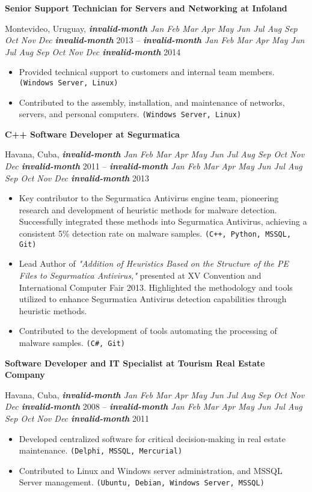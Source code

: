 \documentclass[a4paper]{article}
\newcommand{\invalidmonth}{\emph{\textbf{invalid-month}}}
\newcommand{\cvmonth}[1]{
  \ifcase#1 \invalidmonth
    \or Jan
    \or Feb
    \or Mar
    \or Apr
    \or May
    \or Jun
    \or Jul
    \or Aug
    \or Sep
    \or Oct
    \or Nov
    \or Dec
  \else
    \invalidmonth
  \fi
}
\newcommand{\cvdate}[2]{
  \emph{\cvmonth{#1}} {#2}
}
\newcommand{\cvposition}[2]{
  \noindent\textbf{#1 at #2}\par
}
\newcommand{\cvlocation}[3]{
  \noindent #1, #2 -- #3\par
}
\newenvironment{cvexperience}{
  \noindent{\large\textbf{Work Experience:}}
  \medskip
}{
  \bigskip
}
\newenvironment{cvjob}{
  \begin{sloppypar}
}{
  \end{sloppypar}
  \bigskip
}
\newcommand{\cvskills}[1]{\texttt{(#1)}}
\begin{document}
\begin{cvexperience}
\begin{cvjob}
  \cvposition{Senior Support Technician for Servers and Networking}{Infoland}
  \cvlocation{Montevideo, Uruguay}{\cvdate{11}{2013}}{\cvdate{7}{2014}}
  
  \begin{itemize}
    \item Provided technical support to customers and internal team members. \cvskills{Windows Server, Linux}
    \item Contributed to the assembly, installation, and maintenance of networks, servers, and personal computers. \cvskills{Windows Server, Linux}
  \end{itemize}
\end{cvjob}

\newpage
\begin{cvjob}
  \cvposition{C++ Software Developer}{Segurmatica}  
  \cvlocation{Havana, Cuba}{\cvdate{3}{2011}}{\cvdate{6}{2013}}

  \begin{itemize}
    \item Key contributor to the Segurmatica Antivirus engine team, pioneering research and
    development of heuristic methods for malware detection. Successfully integrated these methods
    into Segurmatica Antivirus, achieving a consistent 5\% detection rate on malware samples. \cvskills{C++, Python, MSSQL, Git}
    
    \item Lead Author of \emph{"Addition of Heuristics Based on the Structure
    of the PE Files to Segurmatica Antivirus,"} presented at XV Convention and International Computer Fair
    2013. Highlighted the methodology and tools utilized to enhance Segurmatica Antivirus detection capabilities through heuristic methods.
    
    \item Contributed to the development of tools automating the processing of malware samples. \cvskills{C\#, Git}
  \end{itemize}
\end{cvjob}

\begin{cvjob}
  \cvposition{Software Developer and IT Specialist}{Tourism Real Estate Company}
  \cvlocation{Havana, Cuba}{\cvdate{10}{2008}}{\cvdate{2}{2011}}

  \begin{itemize}
    \item Developed centralized software for critical decision-making in real estate maintenance. \cvskills{Delphi, MSSQL, Mercurial}
    \item Contributed to Linux and Windows server administration, and MSSQL Server management. \cvskills{Ubuntu, Debian, Windows Server, MSSQL}
  \end{itemize}
\end{cvjob}


\end{cvexperience}
\end{document}
